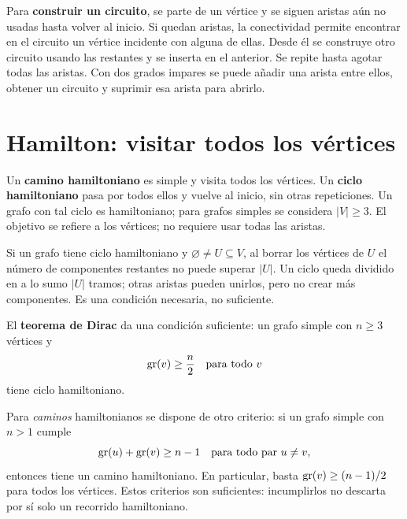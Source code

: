 Para \textbf{construir un circuito}, se parte de un vértice y se
siguen aristas aún no usadas hasta volver al inicio.
Si quedan aristas, la conectividad permite encontrar en el circuito
un vértice incidente con alguna de ellas. Desde él se construye otro
circuito usando las restantes y se inserta en el anterior.
Se repite hasta agotar todas las aristas.
Con dos grados impares se puede añadir una arista entre ellos,
obtener un circuito y suprimir esa arista para abrirlo.

\section{Hamilton: visitar todos los vértices}
\label{md:hamilton}

Un \textbf{camino hamiltoniano} es simple y visita todos los vértices.
Un \textbf{ciclo hamiltoniano} pasa por todos ellos y vuelve al inicio,
sin otras repeticiones. Un grafo con tal ciclo es hamiltoniano;
para grafos simples se considera $|V|\ge3$.
El objetivo se refiere a los vértices; no requiere usar todas las aristas.

Si un grafo tiene ciclo hamiltoniano y $\varnothing\ne U\subseteq V$,
al borrar los vértices de $U$ el número de componentes restantes
no puede superar $|U|$.
Un ciclo queda dividido en a lo sumo $|U|$ tramos; otras aristas
pueden unirlos, pero no crear más componentes.
Es una condición necesaria, no suficiente.

El \textbf{teorema de Dirac} da una condición suficiente:
un grafo simple con $n\ge3$ vértices y
\[
 \operatorname{gr}(v)\ge\frac n2\quad\text{para todo }v
\]
tiene ciclo hamiltoniano.

Para \emph{caminos} hamiltonianos se dispone de otro criterio:
si un grafo simple con $n>1$ cumple
\[
 \operatorname{gr}(u)+\operatorname{gr}(v)\ge n-1\quad\text{para todo par }u\ne v,
\]
entonces tiene un camino hamiltoniano. En particular, basta
$\operatorname{gr}(v)\ge(n-1)/2$ para todos los vértices.
Estos criterios son suficientes: incumplirlos no descarta por sí solo
un recorrido hamiltoniano.
